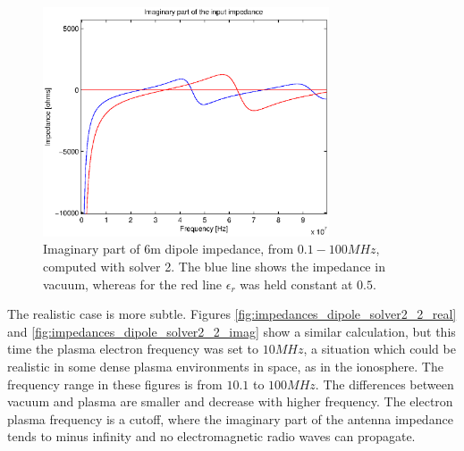 \documentclass[draft,ras]{agutex}
\begin{document}
\begin{article}
\begin{figure}
\noindent\includegraphics[width=20pc]{imps_dipole_solver2_imag.eps}
\caption{Imaginary part of 6m dipole impedance, from $0.1 - 100 MHz$, computed with solver 2. The blue line shows the impedance in vacuum, whereas for the red line $\epsilon_r$ was held constant at $0.5$.}
\label{fig:impedances_dipole_solver2_imag}
\end{figure}

The realistic case is more subtle. Figures \ref{fig:impedances_dipole_solver2_2_real} and \ref{fig:impedances_dipole_solver2_2_imag} show a similar calculation, but this time the plasma electron frequency was set to $10MHz$, a situation which could be realistic in some dense plasma environments in space, as in the ionosphere. The frequency range in these figures is from $10.1$ to $100MHz$. The differences between vacuum and plasma are smaller and decrease with higher frequency. The electron plasma frequency is a cutoff, where the imaginary part of the antenna impedance tends to minus infinity and no electromagnetic radio waves can propagate.


\end{article}
\end{document}
